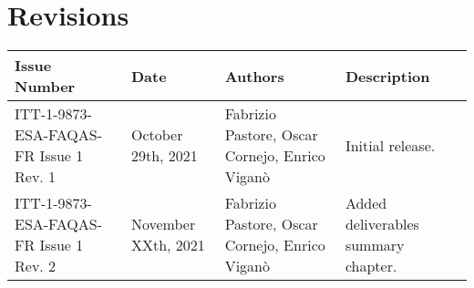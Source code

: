 
\section*{Revisions}
\label{sec:revisions}


\setlength\LTleft{0pt}
\setlength\LTright{0pt}
\tiny 
\begin{longtable}{|p{2cm}|p{1cm}|p{1.5cm}|p{9cm}|@{}}
\label{table:codeoperators} \\
\hline
\textbf{Issue Number}&\textbf{Date}&\textbf{Authors}&\textbf{Description}\\
\hline
ITT-1-9873-ESA-FAQAS-FR
Issue 1 Rev. 1&
October 29th, 2021&
Fabrizio Pastore, Oscar Cornejo, Enrico Viganò&
\begin{minipage}{8cm}
Initial release.
\end{minipage}
\\
\hline
ITT-1-9873-ESA-FAQAS-FR
Issue 1 Rev. 2&
November XXth, 2021&
Fabrizio Pastore, Oscar Cornejo, Enrico Viganò&
\begin{minipage}{8cm}
Added deliverables summary chapter.
\end{minipage}
\\
\hline
                                                    
\end{longtable}
\normalsize

\clearpage